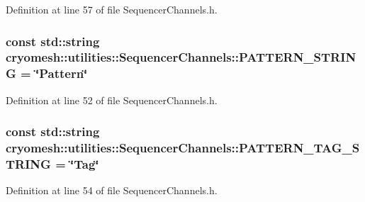 \-Definition at line 57 of file \-Sequencer\-Channels.\-h.

\hypertarget{classcryomesh_1_1utilities_1_1SequencerChannels_adc4ea1f64be75191056ad9e7d21e72ee}{
\subsubsection[{\-P\-A\-T\-T\-E\-R\-N\-\_\-\-S\-T\-R\-I\-N\-G}]{\setlength{\rightskip}{0pt plus 5cm}const std\-::string {\bf cryomesh\-::utilities\-::\-Sequencer\-Channels\-::\-P\-A\-T\-T\-E\-R\-N\-\_\-\-S\-T\-R\-I\-N\-G} = \char`\"{}\-Pattern\char`\"{}}}\label{classcryomesh_1_1utilities_1_1SequencerChannels_adc4ea1f64be75191056ad9e7d21e72ee}


\-Definition at line 52 of file \-Sequencer\-Channels.\-h.

\hypertarget{classcryomesh_1_1utilities_1_1SequencerChannels_a57f20daf1718ac1e76bbafb1e5df6cf0}{
\subsubsection[{\-P\-A\-T\-T\-E\-R\-N\-\_\-\-T\-A\-G\-\_\-\-S\-T\-R\-I\-N\-G}]{\setlength{\rightskip}{0pt plus 5cm}const std\-::string {\bf cryomesh\-::utilities\-::\-Sequencer\-Channels\-::\-P\-A\-T\-T\-E\-R\-N\-\_\-\-T\-A\-G\-\_\-\-S\-T\-R\-I\-N\-G} = \char`\"{}\-Tag\char`\"{}}}\label{classcryomesh_1_1utilities_1_1SequencerChannels_a57f20daf1718ac1e76bbafb1e5df6cf0}


\-Definition at line 54 of file \-Sequencer\-Channels.\-h.

